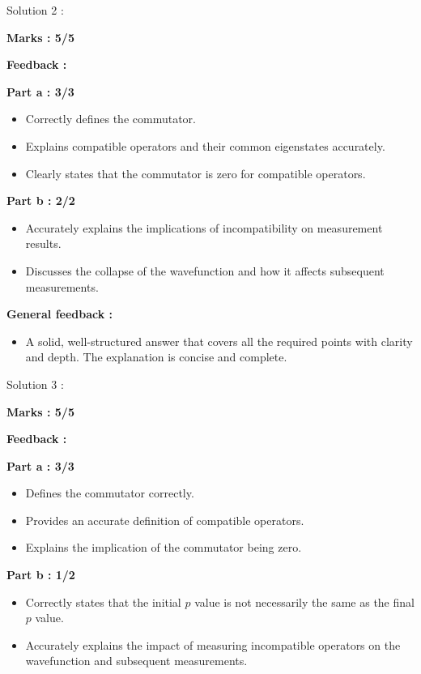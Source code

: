 \documentclass[a4paper,11pt]{article}
\begin{document}
Solution 2 :

\textbf{Marks : 5/5}

\textbf{Feedback : }

\textbf{Part a : 3/3}

\begin{itemize}
    \item Correctly defines the commutator.
    \item Explains compatible operators and their common eigenstates accurately.
    \item Clearly states that the commutator is zero for compatible operators.
\end{itemize}

\textbf{Part b : 2/2}

\begin{itemize}
    \item Accurately explains the implications of incompatibility on measurement results.
    \item Discusses the collapse of the wavefunction and how it affects subsequent measurements.
\end{itemize}

\textbf{General feedback :}

\begin{itemize}
    \item A solid, well-structured answer that covers all the required points with clarity and depth. The explanation is concise and complete.
\end{itemize}


Solution 3 :

\textbf{Marks : 5/5}

\textbf{Feedback : }

\textbf{Part a : 3/3}

\begin{itemize}
    \item Defines the commutator correctly.
    \item Provides an accurate definition of compatible operators.
    \item Explains the implication of the commutator being zero.
\end{itemize}

\textbf{Part b : 1/2}

\begin{itemize}
    \item Correctly states that the initial $p$ value is not necessarily the same as the final $p$ value.
    \item Accurately explains the impact of measuring incompatible operators on the wavefunction and subsequent measurements.
\end{itemize}
\end{document}
